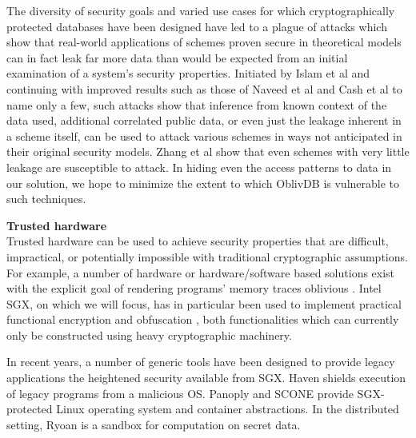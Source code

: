 \documentclass[USenglish,oneside,twocolumn]{article}
\def\name/{OblivDB}
\begin{document}
The diversity of security goals and varied use cases for which cryptographically protected databases have been designed have led to a plague of attacks which show that real-world applications of schemes proven secure in theoretical models can in fact leak far more data than would be expected from an initial examination of a system's security properties. Initiated by Islam et al \cite{IKK12} and continuing with improved results such as those of Naveed et al \cite{NKW15} and Cash et al \cite{CGPR15} to name only a few, such attacks show that inference from known context of the data used, additional correlated public data, or even just the leakage inherent in a scheme itself, can be used to attack various schemes in ways not anticipated in their original security models. Zhang et al \cite{ZKP16} show that even schemes with very little leakage are susceptible to attack. In hiding even the access patterns to data in our solution, we hope to minimize the extent to which \name/ is vulnerable to such techniques.   

\medskip \noindent \textbf{Trusted hardware}\\
Trusted hardware can be used to achieve security properties that are difficult, impractical, or potentially impossible with traditional cryptographic assumptions. For example, a number of hardware or hardware/software based solutions exist with the explicit goal of rendering programs' memory traces oblivious \cite{CLD16, LHM+15, MLS+13}. Intel SGX, on which we will focus, has in particular been used to implement practical functional encryption \cite{FVBG16} and obfuscation \cite{NFR+17}, both functionalities which can currently only be constructed using heavy cryptographic machinery.

In recent years, a number of generic tools have been designed to provide legacy applications the heightened security available from SGX. Haven \cite{BPH15} shields execution of legacy programs from a malicious OS. Panoply and SCONE \cite{STTS17, ATG+16} provide SGX-protected Linux operating system and container abstractions. In the distributed setting, Ryoan \cite{HZX+16} is a sandbox for computation on secret data. 
\end{document}
